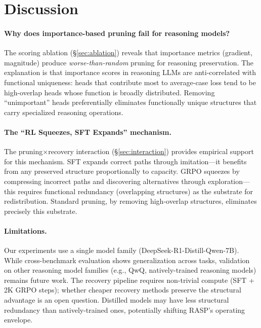 \documentclass[11pt]{article}
\begin{document}
\section{Discussion}
\label{sec:discussion}

\paragraph{Why does importance-based pruning fail for reasoning models?}
The scoring ablation (\S\ref{sec:ablation}) reveals that importance metrics (gradient, magnitude) produce \emph{worse-than-random} pruning for reasoning preservation.
The explanation is that importance scores in reasoning LLMs are anti-correlated with functional uniqueness: heads that contribute most to average-case loss tend to be high-overlap heads whose function is broadly distributed.
Removing ``unimportant'' heads preferentially eliminates functionally unique structures that carry specialized reasoning operations.

\paragraph{The ``RL Squeezes, SFT Expands'' mechanism.}
The pruning$\times$recovery interaction (\S\ref{sec:interaction}) provides empirical support for this mechanism.
SFT expands correct paths through imitation---it benefits from any preserved structure proportionally to capacity.
GRPO squeezes by compressing incorrect paths and discovering alternatives through exploration---this requires functional redundancy (overlapping structures) as the substrate for redistribution.
Standard pruning, by removing high-overlap structures, eliminates precisely this substrate.

\paragraph{Limitations.}
Our experiments use a single model family (DeepSeek-R1-Distill-Qwen-7B).
While cross-benchmark evaluation shows generalization across tasks, validation on other reasoning model families (e.g., QwQ, natively-trained reasoning models) remains future work.
The recovery pipeline requires non-trivial compute (SFT + 2K GRPO steps); whether cheaper recovery methods preserve the structural advantage is an open question.
Distilled models may have less structural redundancy than natively-trained ones, potentially shifting RASP's operating envelope.


\end{document}
